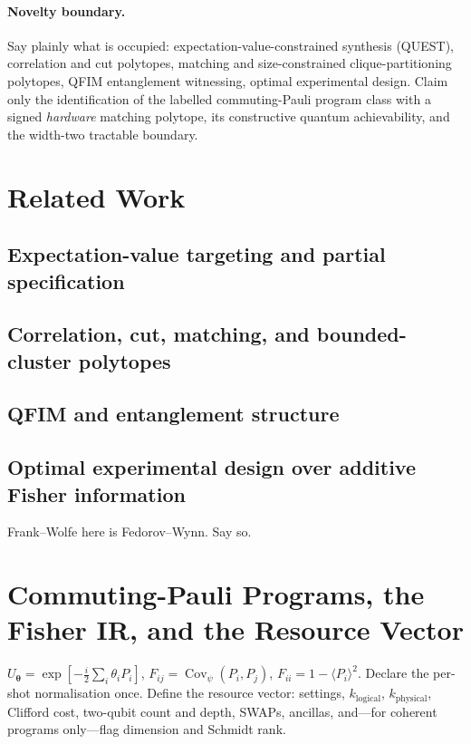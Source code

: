 \documentclass[11pt]{article}
\begin{document}
\paragraph{Novelty boundary.}
Say plainly what is occupied: expectation-value-constrained synthesis (QUEST), correlation
and cut polytopes, matching and size-constrained clique-partitioning polytopes, QFIM
entanglement witnessing, optimal experimental design. Claim only the identification of the
labelled commuting-Pauli program class with a signed \emph{hardware} matching polytope, its
constructive quantum achievability, and the width-two tractable boundary.

\section{Related Work}
\subsection{Expectation-value targeting and partial specification}
\subsection{Correlation, cut, matching, and bounded-cluster polytopes}
\subsection{QFIM and entanglement structure}
\subsection{Optimal experimental design over additive Fisher information}
Frank--Wolfe here is Fedorov--Wynn. Say so.

\section{Commuting-Pauli Programs, the Fisher IR, and the Resource Vector}
$U_{\bm\theta}=\exp[-\tfrac i2\sum_i\theta_iP_i]$, $F_{ij}=\operatorname{Cov}_\psi(P_i,P_j)$,
$F_{ii}=1-\langle P_i\rangle^2$. Declare the per-shot normalisation once. Define the resource
vector: settings, $k_{\mathrm{logical}}$, $k_{\mathrm{physical}}$, Clifford cost, two-qubit
count and depth, SWAPs, ancillas, and---for coherent programs only---flag dimension and
Schmidt rank.
\end{document}
